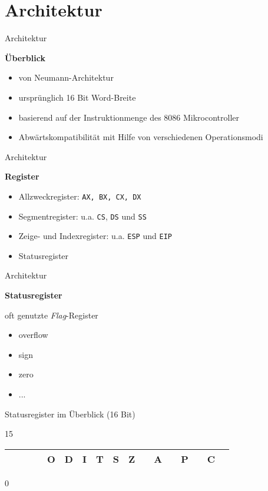 \section{Architektur}

\begin{frame}{Architektur}
	\begin{center}
	\textbf{Überblick}
	\end{center}

	\begin{itemize}
		\item von Neumann-Architektur
		\item ursprünglich 16 Bit Word-Breite
		\item basierend auf der Instruktionmenge des 8086 Mikrocontroller
		\item Abwärtskompatibilität mit Hilfe von verschiedenen Operationsmodi
	\end{itemize}
\end{frame}


\begin{frame}{Architektur}
	\begin{center}
	\textbf{Register}
	\end{center}

	\begin{itemize}
		\item Allzweckregister: \texttt{AX, BX, CX, DX}
		\item Segmentregister: u.a. \texttt{CS}, \texttt{DS} und \texttt{SS}
		\item Zeige- und Indexregister: u.a. \texttt{ESP} und \texttt{EIP}   
		\item Statusregister
	\end{itemize}
\end{frame}


\begin{frame}{Architektur}
	\begin{center}
	\textbf{Statusregister}
	\end{center}

	oft genutzte \textit{Flag}-Register
	\begin{itemize}
		\item overflow
		\item sign
		\item zero
		\item ...
	\end{itemize}

	\makebox{}

	Statusregister im Überblick (16 Bit)
	\begin{center}
		{\small 15}
		\begin{tabular}{|c|c|c|c|c|c|c|c|c|c|c|c|c|c|c|c|c|}
		\hline & & & & O & D & I & T & S & Z & & A & & P & & C \\
		\hline
		\end{tabular}
		{\small 0}
	\end{center}
\end{frame}

